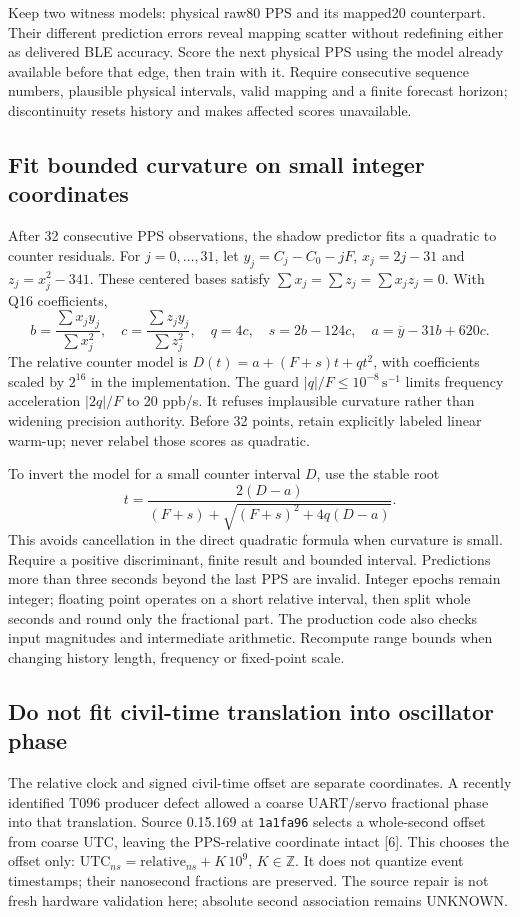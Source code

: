 \documentclass[10pt,letterpaper]{article}
\newcommand{\src}[1]{\nolinkurl{#1}}
\begin{document}
Keep two witness models: physical raw80 PPS and its mapped20 counterpart. Their different prediction errors reveal mapping scatter without redefining either as delivered BLE accuracy. Score the next physical PPS using the model already available before that edge, then train with it. Require consecutive sequence numbers, plausible physical intervals, valid mapping and a finite forecast horizon; discontinuity resets history and makes affected scores unavailable.

\subsection{Fit bounded curvature on small integer coordinates}
After 32 consecutive PPS observations, the shadow predictor fits a quadratic to counter residuals. For $j=0,\ldots,31$, let $y_j=C_j-C_0-jF$, $x_j=2j-31$ and $z_j=x_j^2-341$. These centered bases satisfy $\sum x_j=\sum z_j=\sum x_jz_j=0$. With Q16 coefficients,
\[
 b=\frac{\sum x_jy_j}{\sum x_j^2},\quad
 c=\frac{\sum z_jy_j}{\sum z_j^2},\quad
 q=4c,\quad s=2b-124c,\quad a=\overline y-31b+620c.
\]
The relative counter model is $D(t)=a+(F+s)t+qt^2$, with coefficients scaled by $2^{16}$ in the implementation. The guard $|q|/F\le10^{-8}\,\mathrm{s}^{-1}$ limits frequency acceleration $|2q|/F$ to 20 ppb/s. It refuses implausible curvature rather than widening precision authority. Before 32 points, retain explicitly labeled linear warm-up; never relabel those scores as quadratic.

To invert the model for a small counter interval $D$, use the stable root
\[
 t=\frac{2(D-a)}{(F+s)+\sqrt{(F+s)^2+4q(D-a)}}.
\]
This avoids cancellation in the direct quadratic formula when curvature is small. Require a positive discriminant, finite result and bounded interval. Predictions more than three seconds beyond the last PPS are invalid. Integer epochs remain integer; floating point operates on a short relative interval, then split whole seconds and round only the fractional part. The production code also checks input magnitudes and intermediate arithmetic. Recompute range bounds when changing history length, frequency or fixed-point scale.

\subsection{Do not fit civil-time translation into oscillator phase}
The relative clock and signed civil-time offset are separate coordinates. A recently identified T096 producer defect allowed a coarse UART/servo fractional phase into that translation. Source 0.15.169 at \src{1a1fa96} selects a whole-second offset from coarse UTC, leaving the PPS-relative coordinate intact [6]. This chooses the offset only: $\mathrm{UTC}_{ns}=\mathrm{relative}_{ns}+K\,10^9$, $K\in\mathbb Z$. It does not quantize event timestamps; their nanosecond fractions are preserved. The source repair is not fresh hardware validation here; absolute second association remains UNKNOWN.
\end{document}
